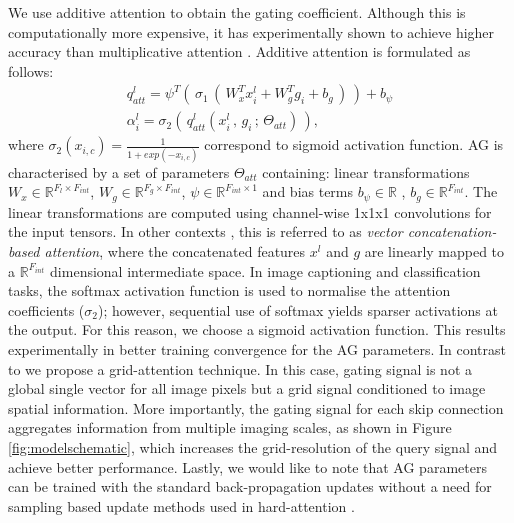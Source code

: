 \documentclass{article}
\newcommand{\R}[0]{\mathbb{R}} %
\begin{document}
We use additive attention \cite{bahdanau2014neural} to obtain the gating coefficient. Although this is computationally more expensive, it has experimentally shown to achieve higher accuracy than multiplicative attention \cite{luong2015effective}. Additive attention is formulated as follows: 
\begin{gather}
q^l_{att} = \psi^T \left(\, \sigma_1\,(\,W_x^T x_i^l + W_g^T g_i + b_g\,)\,\right) + b_{\psi} \\
\alpha_i^l = \sigma_2 (\, q^l_{att}(x_{i}^l\,,\, g_i \,;\, \Theta_{att}) \,), 
\end{gather}
where $\sigma_2(x_{i,c}) = \frac{1}{1+exp(-x_{i,c})}$ correspond to sigmoid activation function. AG is characterised by a set of parameters $\Theta_{att}$ containing: linear transformations $W_x \in \R^{F_l \times F_{int}}$, $W_g \in  \R^{F_g \times F_{int}}$, $\psi \in \R^{F_{int} \times 1}$ and bias terms $b_{\psi} \in \R$ , $b_{g} \in \R^{F_{int}}$. The linear transformations are computed using channel-wise 1x1x1 convolutions for the input tensors. In other contexts \cite{wang2017non}, this is referred to as \emph{vector concatenation-based attention}, where the concatenated features $x^l$ and $g$ are linearly mapped to a $\R^{F_{int}}$ dimensional intermediate space. In image captioning \cite{anderson2017bottom} and classification \cite{jetley2018learn} tasks, the softmax activation function is used to normalise the attention coefficients ($\sigma_2$); however, sequential use of softmax yields sparser activations at the output. For this reason, we choose a sigmoid activation function. This results experimentally in better training convergence for the AG parameters. In contrast to \cite{jetley2018learn} we propose a grid-attention technique. In this case, gating signal is not a global single vector for all image pixels but a grid signal conditioned to image spatial information. More importantly, the gating signal for each skip connection aggregates information from multiple imaging scales, as shown in Figure \ref{fig:modelschematic}, which increases the grid-resolution of the query signal and achieve better performance. Lastly, we would like to note that AG parameters can be trained with the standard back-propagation updates without a need for sampling based update methods used in hard-attention \cite{mnih2014recurrent}. 
\end{document}
